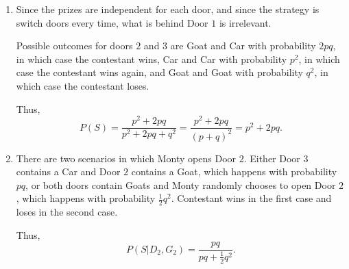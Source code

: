 \begin{enumerate}[label=(\alph*)]
\item Since the prizes are independent for each door, and since the strategy is
switch doors every time, what is behind Door $1$ is irrelevant. 

Possible outcomes for doors $2$ and $3$ are Goat and Car with probability $2pq$,
in which case the contestant wins, Car and Car with probability $p^{2}$, in
which case the contestant wins again, and Goat and Goat with probability $q^
{2}$, in which case the contestant loses.

Thus, $$P(S) = \frac{p^2 + 2pq}{p^2 + 2pq + q^{2}} = \frac{p^2 + 2pq}{(p+q)^
{2}} = p^{2} + 2pq.$$

\item There are two scenarios in which Monty opens Door $2$. Either Door $3$
contains a Car and Door $2$ contains a Goat, which happens with probability
$pq$, or both doors contain Goats and Monty randomly chooses to open Door $2$,
which happens with probability $\frac{1}{2}q^{2}$. Contestant wins in the first
case and loses in the second case.

Thus, $$P(S|D_{2}, G_{2}) = \frac{pq}{pq + \frac{1}{2}q^{2}}.$$
\end{enumerate}